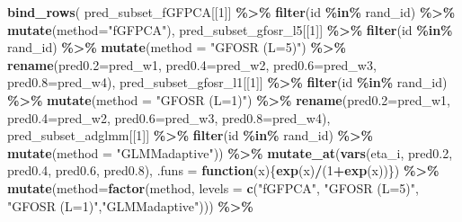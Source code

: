 \documentclass[
]{article}
\newenvironment{Shaded}{\begin{snugshade}}{\end{snugshade}}
\newcommand{\AttributeTok}[1]{\textcolor[rgb]{0.13,0.29,0.53}{#1}}
\newcommand{\ControlFlowTok}[1]{\textcolor[rgb]{0.13,0.29,0.53}{\textbf{#1}}}
\newcommand{\DecValTok}[1]{\textcolor[rgb]{0.00,0.00,0.81}{#1}}
\newcommand{\FloatTok}[1]{\textcolor[rgb]{0.00,0.00,0.81}{#1}}
\newcommand{\FunctionTok}[1]{\textcolor[rgb]{0.13,0.29,0.53}{\textbf{#1}}}
\newcommand{\NormalTok}[1]{#1}
\newcommand{\SpecialCharTok}[1]{\textcolor[rgb]{0.81,0.36,0.00}{\textbf{#1}}}
\newcommand{\StringTok}[1]{\textcolor[rgb]{0.31,0.60,0.02}{#1}}
\begin{document}
\begin{Shaded}
\begin{Highlighting}[]
\FunctionTok{bind\_rows}\NormalTok{(}
\NormalTok{  pred\_subset\_fGFPCA[[}\DecValTok{1}\NormalTok{]] }\SpecialCharTok{\%\textgreater{}\%} \FunctionTok{filter}\NormalTok{(id }\SpecialCharTok{\%in\%}\NormalTok{ rand\_id) }\SpecialCharTok{\%\textgreater{}\%} \FunctionTok{mutate}\NormalTok{(}\AttributeTok{method=}\StringTok{"fGFPCA"}\NormalTok{),}
\NormalTok{  pred\_subset\_gfosr\_l5[[}\DecValTok{1}\NormalTok{]] }\SpecialCharTok{\%\textgreater{}\%} \FunctionTok{filter}\NormalTok{(id }\SpecialCharTok{\%in\%}\NormalTok{ rand\_id) }\SpecialCharTok{\%\textgreater{}\%} \FunctionTok{mutate}\NormalTok{(}\AttributeTok{method =} \StringTok{"GFOSR (L=5)"}\NormalTok{) }\SpecialCharTok{\%\textgreater{}\%} 
    \FunctionTok{rename}\NormalTok{(}\AttributeTok{pred0.2=}\NormalTok{pred\_w1, }\AttributeTok{pred0.4=}\NormalTok{pred\_w2, }\AttributeTok{pred0.6=}\NormalTok{pred\_w3, }\AttributeTok{pred0.8=}\NormalTok{pred\_w4),}
\NormalTok{  pred\_subset\_gfosr\_l1[[}\DecValTok{1}\NormalTok{]] }\SpecialCharTok{\%\textgreater{}\%} \FunctionTok{filter}\NormalTok{(id }\SpecialCharTok{\%in\%}\NormalTok{ rand\_id) }\SpecialCharTok{\%\textgreater{}\%} \FunctionTok{mutate}\NormalTok{(}\AttributeTok{method =} \StringTok{"GFOSR (L=1)"}\NormalTok{) }\SpecialCharTok{\%\textgreater{}\%}
    \FunctionTok{rename}\NormalTok{(}\AttributeTok{pred0.2=}\NormalTok{pred\_w1, }\AttributeTok{pred0.4=}\NormalTok{pred\_w2, }\AttributeTok{pred0.6=}\NormalTok{pred\_w3, }\AttributeTok{pred0.8=}\NormalTok{pred\_w4),}
\NormalTok{  pred\_subset\_adglmm[[}\DecValTok{1}\NormalTok{]] }\SpecialCharTok{\%\textgreater{}\%} \FunctionTok{filter}\NormalTok{(id }\SpecialCharTok{\%in\%}\NormalTok{ rand\_id) }\SpecialCharTok{\%\textgreater{}\%} \FunctionTok{mutate}\NormalTok{(}\AttributeTok{method =} \StringTok{"GLMMadaptive"}\NormalTok{)) }\SpecialCharTok{\%\textgreater{}\%}
  \FunctionTok{mutate\_at}\NormalTok{(}\FunctionTok{vars}\NormalTok{(eta\_i, pred0}\FloatTok{.2}\NormalTok{, pred0}\FloatTok{.4}\NormalTok{, pred0}\FloatTok{.6}\NormalTok{, pred0}\FloatTok{.8}\NormalTok{), }
                \AttributeTok{.funs =} \ControlFlowTok{function}\NormalTok{(x)\{}\FunctionTok{exp}\NormalTok{(x)}\SpecialCharTok{/}\NormalTok{(}\DecValTok{1}\SpecialCharTok{+}\FunctionTok{exp}\NormalTok{(x))\}) }\SpecialCharTok{\%\textgreater{}\%}
  \FunctionTok{mutate}\NormalTok{(}\AttributeTok{method=}\FunctionTok{factor}\NormalTok{(method, }
         \AttributeTok{levels =} \FunctionTok{c}\NormalTok{(}\StringTok{"fGFPCA"}\NormalTok{, }\StringTok{"GFOSR (L=5)"}\NormalTok{, }\StringTok{"GFOSR (L=1)"}\NormalTok{,}\StringTok{"GLMMadaptive"}\NormalTok{))) }\SpecialCharTok{\%\textgreater{}\%}

\end{Highlighting}
\end{Shaded}
\end{document}
